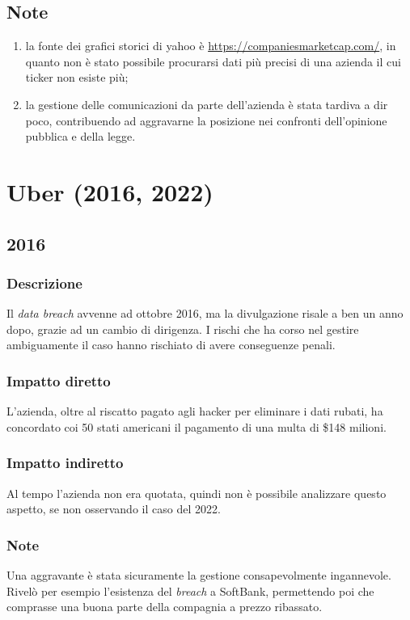 \documentclass[12pt,a4paper,openright,twoside]{report}
\begin{document}
\subsection{Note}
\begin{enumerate}
    \item la fonte dei grafici storici di yahoo \`e \href{https://companiesmarketcap.com/yahoo/stock-price-history}{https://companiesmarketcap.com/}, in quanto non \`e stato possibile procurarsi dati pi\`u precisi di una azienda il cui ticker non esiste pi\`u;
    \item la gestione delle comunicazioni da parte dell'azienda \`e stata tardiva a dir poco, contribuendo ad aggravarne la posizione nei confronti dell'opinione pubblica e della legge.
\end{enumerate}
\section{Uber (2016, 2022)}
\subsection{2016}
\subsubsection{Descrizione}
Il \textit{data breach} avvenne ad ottobre 2016, ma la divulgazione risale a ben un anno dopo, grazie ad un cambio di dirigenza. I rischi che ha corso nel gestire ambiguamente il caso hanno rischiato di avere conseguenze penali\cite{Uber_plusEquifaxAndYahoo}.\\ 
\subsubsection{Impatto diretto}
L'azienda, oltre al riscatto pagato agli hacker per eliminare i dati rubati, ha concordato coi 50 stati americani il pagamento di una multa di \$148 milioni.\\
\subsubsection{Impatto indiretto}
Al tempo l'azienda non era quotata, quindi non \`e possibile analizzare questo aspetto, se non osservando il caso del 2022.\\
\subsubsection{Note}
Una aggravante \`e stata sicuramente la gestione consapevolmente ingannevole. Rivel\`o per esempio  l'esistenza del \textit{breach} a SoftBank, permettendo poi che comprasse una buona parte della compagnia a prezzo ribassato\cite{Uber_plusEquifaxAndYahoo}.\\   
\end{document}
